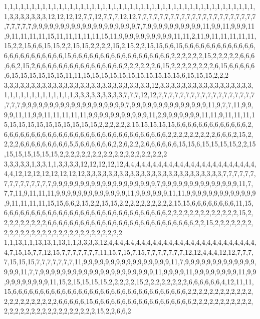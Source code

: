 1,1,1,1,1,1,1,1,1,1,1,1,1,1,1,1,1,1,1,1,1,1,1,1,1,1,1,1,1,1,1,1,1,1,1,1,1,1,1,1,1,1,1,1,1,1,1,3,3,3,3,3,3,3,12,12,12,12,7,7,12,7,7,7,12,12,7,7,7,7,7,7,7,7,7,7,7,7,7,7,7,7,7,7,7,7,7,7,7,7,7,7,7,9,9,9,9,9,9,9,9,9,9,9,9,9,9,9,9,9,9,9,7,7,9,9,9,9,9,9,9,9,9,9,11,9,9,11,9,9,9,11,9,11,11,11,11,15,11,11,11,11,11,15,11,9,9,9,9,9,9,9,9,9,9,11,11,2,11,9,11,11,11,11,11,15,2,2,15,6,6,15,15,2,2,15,15,2,2,2,2,15,2,15,2,2,15,15,6,6,15,6,6,6,6,6,6,6,6,6,6,6,6,6,6,6,6,6,6,6,6,6,6,6,6,15,6,6,6,6,6,6,6,6,6,6,6,6,6,6,6,6,6,6,2,2,2,2,2,2,15,2,2,2,2,2,6,6,6,6,6,2,15,2,6,6,6,6,6,6,6,6,6,6,6,6,6,6,6,6,2,2,2,2,2,2,6,15,2,2,2,2,2,2,2,2,6,15,6,6,6,6,6,6,15,15,15,15,15,15,11,11,15,15,15,15,15,15,15,15,15,15,15,6,15,15,15,2,2,2
3,3,3,3,3,3,3,3,3,3,3,3,3,3,3,3,3,3,3,3,3,3,3,3,3,3,3,12,3,3,3,3,3,3,3,3,3,3,3,3,3,3,3,3,3,1,1,1,1,1,1,1,1,1,1,1,1,1,3,3,3,3,3,3,3,3,3,7,7,7,12,12,7,7,7,7,7,7,7,7,7,7,7,7,7,7,7,7,7,7,7,7,7,9,9,9,9,9,9,9,9,9,9,9,9,9,9,9,9,9,9,9,7,9,9,9,9,9,9,9,9,9,9,9,9,9,9,11,9,7,7,11,9,9,9,9,11,11,9,9,11,11,11,11,11,9,9,9,9,9,9,9,9,9,9,9,11,2,9,9,9,9,9,9,9,11,11,9,11,11,11,15,15,15,15,15,15,15,15,15,15,15,2,2,2,2,2,2,15,15,15,15,15,6,6,6,6,6,6,6,6,6,6,6,6,6,2,6,6,6,6,6,6,6,6,6,6,6,6,6,6,6,6,6,6,6,6,6,6,6,6,6,6,6,6,6,6,2,2,2,2,2,2,2,2,2,6,6,6,2,15,2,2,2,2,6,6,6,6,6,6,6,6,6,5,5,6,6,6,6,6,6,2,2,6,2,2,2,6,6,6,6,6,6,15,15,6,15,15,15,15,2,2,15,15,15,15,15,15,15,2,2,2,2,2,2,2,2,2,2,2,2,2,2,2,2,2,2,2,2
3,3,3,3,3,1,3,3,1,1,3,3,3,3,12,12,12,12,12,4,4,4,4,4,4,4,4,4,4,4,4,4,4,4,4,4,4,4,4,4,4,4,4,4,4,12,12,12,12,12,12,12,12,3,3,3,3,3,3,3,3,3,3,3,3,3,3,3,3,3,3,3,3,3,3,3,3,3,7,7,7,7,7,7,7,7,7,7,7,7,7,7,7,9,9,9,9,9,9,9,9,9,9,9,9,9,9,9,9,9,9,9,7,9,9,9,9,9,9,9,9,9,9,9,9,9,9,11,7,7,7,11,9,11,11,11,9,9,9,9,9,9,9,9,9,9,9,9,9,11,9,9,9,9,9,9,11,11,9,9,9,9,9,9,9,9,9,9,9,9,9,9,11,11,11,11,15,15,6,6,2,15,2,2,15,15,2,2,2,2,2,2,2,2,2,2,15,15,6,6,6,6,6,6,6,6,11,15,6,6,6,6,6,6,6,6,6,6,6,6,6,6,6,6,6,6,6,6,6,6,6,6,6,6,6,6,6,6,2,2,2,2,2,2,2,2,2,2,2,2,2,15,2,2,2,2,2,2,2,2,2,6,6,6,6,6,6,6,6,6,6,6,6,6,6,6,6,6,6,6,6,6,6,6,6,6,6,6,2,2,15,2,2,2,2,2,2,2,2,2,2,2,2,2,2,2,2,2,2,2,2,2,2,2,2,2,2,2,2,2
1,1,13,1,1,13,13,1,13,1,1,3,3,3,3,12,4,4,4,4,4,4,4,4,4,4,4,4,4,4,4,4,4,4,4,4,4,4,4,4,4,4,4,4,7,15,15,7,7,12,15,7,7,7,7,7,7,7,11,15,7,15,7,15,7,7,7,7,7,7,7,12,12,4,4,4,12,12,7,7,7,7,15,15,15,7,7,7,7,7,7,7,11,9,9,9,9,9,9,9,9,9,9,9,9,9,9,9,9,11,7,9,9,9,9,9,9,9,9,9,9,9,9,9,9,9,9,11,7,7,9,9,9,9,9,9,9,9,9,9,9,9,9,9,9,9,9,9,9,9,9,11,9,9,9,9,11,9,9,9,9,9,9,9,9,11,9,9,9,9,9,9,9,9,9,9,11,15,2,15,15,15,15,2,2,2,2,2,15,2,2,2,2,2,2,2,2,6,6,6,6,6,6,4,12,11,11,15,6,6,6,6,6,6,6,6,6,6,6,6,6,6,6,6,6,6,6,6,6,6,6,6,6,6,6,6,6,6,6,6,2,2,2,2,2,2,2,2,2,2,2,2,2,2,2,2,2,2,2,2,2,2,6,6,6,6,6,15,6,6,6,6,6,6,6,6,6,6,6,6,6,6,6,6,6,6,2,2,2,2,2,2,2,2,2,2,2,2,2,2,2,2,2,2,2,2,2,2,2,2,2,2,2,2,15,2,2,6,6,2
